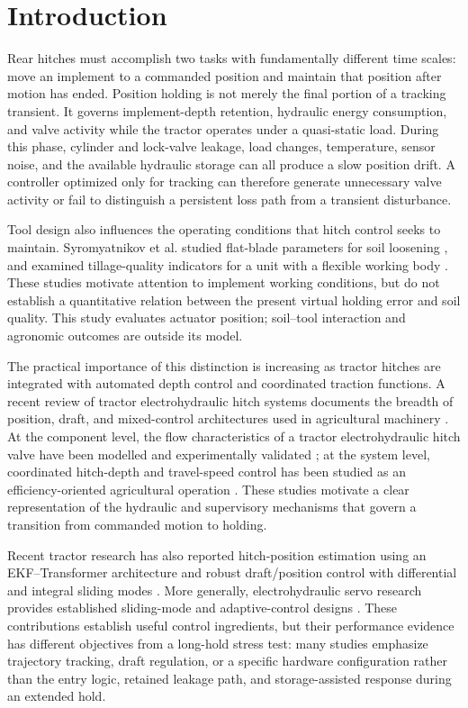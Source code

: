 \documentclass[machines,article,submit,pdftex,moreauthors]{Definitions/mdpi}
\begin{document}
\section{Introduction}
Rear hitches must accomplish two tasks with fundamentally different time scales: move an implement to a commanded position and maintain that position after motion has ended. Position holding is not merely the final portion of a tracking transient. It governs implement-depth retention, hydraulic energy consumption, and valve activity while the tractor operates under a quasi-static load. During this phase, cylinder and lock-valve leakage, load changes, temperature, sensor noise, and the available hydraulic storage can all produce a slow position drift. A controller optimized only for tracking can therefore generate unnecessary valve activity or fail to distinguish a persistent loss path from a transient disturbance.

Tool design also influences the operating conditions that hitch control seeks to maintain. Syromyatnikov et al. studied flat-blade parameters for soil loosening \cite{syromyatnikov2022}, and examined tillage-quality indicators for a unit with a flexible working body \cite{syromyatnikov2023}. These studies motivate attention to implement working conditions, but do not establish a quantitative relation between the present virtual holding error and soil quality. This study evaluates actuator position; soil--tool interaction and agronomic outcomes are outside its model.

The practical importance of this distinction is increasing as tractor hitches are integrated with automated depth control and coordinated traction functions. A recent review of tractor electrohydraulic hitch systems documents the breadth of position, draft, and mixed-control architectures used in agricultural machinery \cite{sun2022}. At the component level, the flow characteristics of a tractor electrohydraulic hitch valve have been modelled and experimentally validated \cite{kumar2021}; at the system level, coordinated hitch-depth and travel-speed control has been studied as an efficiency-oriented agricultural operation \cite{sun2025}. These studies motivate a clear representation of the hydraulic and supervisory mechanisms that govern a transition from commanded motion to holding.

Recent tractor research has also reported hitch-position estimation using an EKF--Transformer architecture \cite{kim2025} and robust draft/position control with differential and integral sliding modes \cite{liu2023}. More generally, electrohydraulic servo research provides established sliding-mode and adaptive-control designs \cite{bai2010,tang2011,jin2013}. These contributions establish useful control ingredients, but their performance evidence has different objectives from a long-hold stress test: many studies emphasize trajectory tracking, draft regulation, or a specific hardware configuration rather than the entry logic, retained leakage path, and storage-assisted response during an extended hold.
\end{document}
